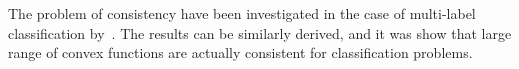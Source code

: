 The problem of consistency have been investigated in the case of multi-label classification by~\citet{zhang2004multi}. The results can be similarly derived, and it was show that large range of convex functions are actually consistent for classification problems.









